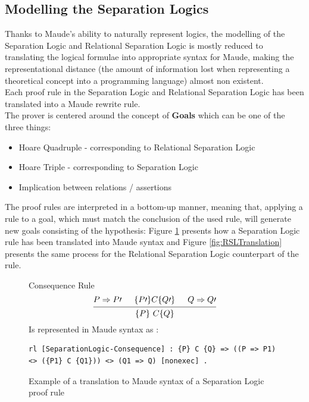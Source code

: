\documentclass[12pt,a4paper]{article}
\begin{document}
{ 
\subsection{Modelling the Separation Logics}
Thanks to Maude's ability to naturally represent logics, the modelling of the Separation Logic and Relational Separation Logic is mostly reduced to translating the logical formulae into appropriate syntax for Maude, making the representational distance (the amount of information lost when representing a theoretical concept into a programming language)\cite{manual} almost non existent. \\

Each proof rule in the Separation Logic and Relational Separation Logic has been translated into a Maude rewrite rule. 
\\
The prover is centered around the concept of \textbf{Goals} which can be one of the three things: 
\begin{itemize}
	\item {Hoare Quadruple} - corresponding to Relational Separation Logic
	\item {Hoare Triple} - corresponding to Separation Logic
	\item {Implication between relations / assertions} 
\end{itemize} 
The proof rules are interpreted in a bottom-up manner, meaning that, applying a rule to a goal, which must match the conclusion of the used rule, will generate new goals consisting of the hypothesis: Figure \ref{fig:SLTranslation} presents how a Separation Logic rule has been translated into Maude syntax and Figure \ref{fig:RSLTranslation} presents the same process for the Relational Separation Logic counterpart of the rule.
\begin{figure}[h]
	Consequence Rule
	\medskip
	\[
	\begin{prooftree}
	\Hypo{P \Rightarrow P\prime}
	\Hypo{\{P\prime\} C \{Q\prime\}}
	\Hypo{Q \Rightarrow Q\prime}
	\Infer 3 {\{P\}\  C  \{Q\}}
	\end{prooftree}	
	\]
	Is represented in Maude syntax as : 
\begin{lstlisting}[caption=Separation Logic Consequence rule]
	rl [SeparationLogic-Consequence] : {P} C {Q} => ((P => P1) <> ({P1} C {Q1})) <> (Q1 => Q) [nonexec] .
\end{lstlisting}
	\caption{Example of a translation to Maude syntax of a Separation Logic proof rule}
	\label{fig:SLTranslation}
\end{figure}

}
\end{document}
